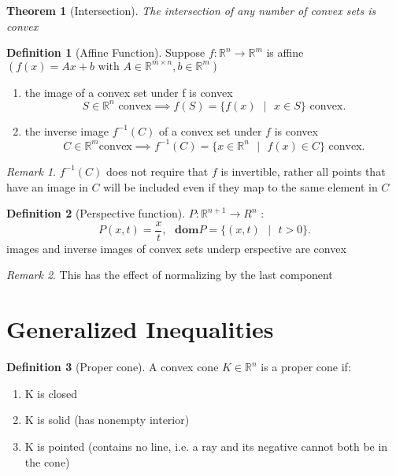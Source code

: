 \documentclass{report}
\newtheorem{theorem}{Theorem}[section]
\theoremstyle{remark} \newtheorem{remark}{Remark}[section]
\theoremstyle{definition}
\newtheorem{definition}{Definition}[section]
\theoremstyle{definition}
\theoremstyle{definition}
\theoremstyle{remark}
\begin{document}
\begin{theorem}[Intersection]
    The intersection of any number of convex sets is convex
\end{theorem}


\begin{definition}[Affine Function]
    Suppose $f: \mathbb{R}^{n} \to \mathbb{R}^{m}$ is affine $(f(x) = Ax + b \text{ with } A\in \mathbb{R}^{m \times n}, b \in \mathbb{R}^{m})$ 
\begin{enumerate}
    \item the image of a convex set under f is convex
        \[
        S \in \mathbb{R}^{n} \text{ convex} \implies f(S) = \{f(x)\text{ } | \text{ } x \in S \} \text{ convex}
        .\] 
        \item the inverse image $f^{-1}(C)$ of a convex set under $f$ is convex
            \[
            C \in \mathbb{R}^{m} \text{convex} \implies f^{-1}(C) = \{x \in \mathbb{R}^{n} \text{ }| \text{ }f(x)\in C\} \text{ convex}
            .\] 
    
\end{enumerate}
       
\end{definition}

\begin{remark}
    $f^{-1}(C)$ does not require that $f$ is invertible, rather all points that have an image in $C$ will be included even if they map to the same element in $C$   
\end{remark}

\begin{definition}[Perspective function]
    $P: \mathbb{R}^{n+1}\to R^{n}$ :
    \[
    P(x,t) = \frac{x}{t}, \text{   }\textbf{dom}P = \{(x,t) \text{ }|\text{ }t>0\}
    .\] 
      images and inverse images of convex sets underp erspective are convex 
\end{definition}

\begin{remark}
    This has the effect of normalizing by the last component   
\end{remark}

\section{Generalized Inequalities}

\begin{definition}[Proper cone]
    A convex cone $K \in \mathbb{R}^{n}$ is a proper cone if:
    \begin{enumerate}
        \item K is closed
            \item K is solid (has nonempty interior)
                \item K is pointed (contains no line, i.e. a ray and its negative cannot both be in the cone)
    \end{enumerate}
       
\end{definition}
\end{document}
